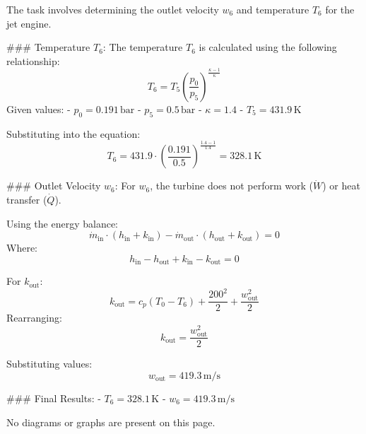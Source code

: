 The task involves determining the outlet velocity \( w_6 \) and temperature \( T_6 \) for the jet engine.  

### Temperature \( T_6 \):  
The temperature \( T_6 \) is calculated using the following relationship:  
\[
T_6 = T_5 \left( \frac{p_0}{p_5} \right)^{\frac{\kappa - 1}{\kappa}}
\]  
Given values:  
- \( p_0 = 0.191 \, \text{bar} \)  
- \( p_5 = 0.5 \, \text{bar} \)  
- \( \kappa = 1.4 \)  
- \( T_5 = 431.9 \, \text{K} \)  

Substituting into the equation:  
\[
T_6 = 431.9 \cdot \left( \frac{0.191}{0.5} \right)^{\frac{1.4 - 1}{1.4}} = 328.1 \, \text{K}
\]  

### Outlet Velocity \( w_6 \):  
For \( w_6 \), the turbine does not perform work (\( \dot{W} \)) or heat transfer (\( \dot{Q} \)).  

Using the energy balance:  
\[
\dot{m}_{\text{in}} \cdot (h_{\text{in}} + k_{\text{in}}) - \dot{m}_{\text{out}} \cdot (h_{\text{out}} + k_{\text{out}}) = 0
\]  
Where:  
\[
h_{\text{in}} - h_{\text{out}} + k_{\text{in}} - k_{\text{out}} = 0
\]  

For \( k_{\text{out}} \):  
\[
k_{\text{out}} = c_p (T_0 - T_6) + \frac{200^2}{2} + \frac{w_{\text{out}}^2}{2}
\]  
Rearranging:  
\[
k_{\text{out}} = \frac{w_{\text{out}}^2}{2}
\]  

Substituting values:  
\[
w_{\text{out}} = 419.3 \, \text{m/s}
\]  

### Final Results:  
- \( T_6 = 328.1 \, \text{K} \)  
- \( w_6 = 419.3 \, \text{m/s} \)  

No diagrams or graphs are present on this page.